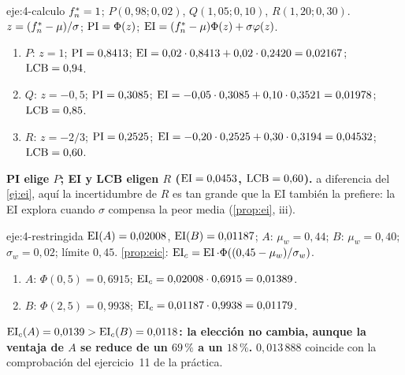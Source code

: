 \begin{solucion}{eje:4-calculo}
\datos $f^{*}_{n}=1$; $P(0{,}98;0{,}02)$, $Q(1{,}05;0{,}10)$, $R(1{,}20;0{,}30)$.
\planteamiento $z=(f^{*}_{n}-\mu)/\sigma$; $\operatorname{PI}=\Phi(z)$; $\operatorname{EI}=(f^{*}_{n}-\mu)\Phi(z)+\sigma\varphi(z)$.
\pasos
\begin{enumerate}[label=\arabic*.]
  \item $P$: $z=1$; $\operatorname{PI}=0{,}8413$; $\operatorname{EI}=0{,}02\cdot0{,}8413+0{,}02\cdot0{,}2420=0{,}02167$; $\operatorname{LCB}=0{,}94$.
  \item $Q$: $z=-0{,}5$; $\operatorname{PI}=0{,}3085$; $\operatorname{EI}=-0{,}05\cdot0{,}3085+0{,}10\cdot0{,}3521=0{,}01978$; $\operatorname{LCB}=0{,}85$.
  \item $R$: $z=-2/3$; $\operatorname{PI}=0{,}2525$; $\operatorname{EI}=-0{,}20\cdot0{,}2525+0{,}30\cdot0{,}3194=0{,}04532$; $\operatorname{LCB}=0{,}60$.
\end{enumerate}
\resultado \textbf{PI elige $P$; EI y LCB eligen $R$ ($\operatorname{EI}=0{,}0453$, $\operatorname{LCB}=0{,}60$).}
\comprobacion a diferencia del \cref{ej:ei}, aquí la incertidumbre de $R$ es tan grande que la EI también la prefiere: la EI explora cuando $\sigma$ compensa la peor media (\cref{prop:ei}, iii).
\end{solucion}

\begin{solucion}{eje:4-restringida}
\datos $\operatorname{EI}(A)=0{,}02008$, $\operatorname{EI}(B)=0{,}01187$; $A$: $\mu_w=0{,}44$; $B$: $\mu_w=0{,}40$; $\sigma_w=0{,}02$; límite $0{,}45$.
\planteamiento \cref{prop:eic}: $\operatorname{EI}_c=\operatorname{EI}\cdot\Phi((0{,}45-\mu_w)/\sigma_w)$.
\pasos
\begin{enumerate}[label=\arabic*.]
  \item $A$: $\Phi(0{,}5)=0{,}6915$; $\operatorname{EI}_c=0{,}02008\cdot0{,}6915=0{,}01389$.
  \item $B$: $\Phi(2{,}5)=0{,}9938$; $\operatorname{EI}_c=0{,}01187\cdot0{,}9938=0{,}01179$.
\end{enumerate}
\resultado \textbf{$\operatorname{EI}_c(A)=0{,}0139>\operatorname{EI}_c(B)=0{,}0118$: la elección no cambia, aunque la ventaja de $A$ se reduce de un $69\,\%$ a un $18\,\%$.}
\comprobacion $0{,}013\,888$ coincide con la comprobación del ejercicio~11 de la práctica.
\end{solucion}

